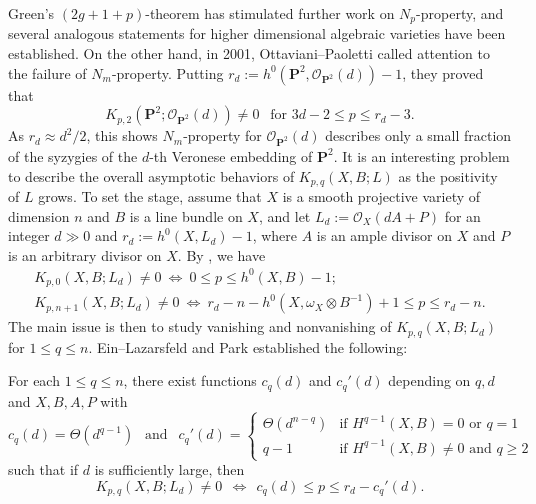 \documentclass[graybox]{svmult}
\newcommand{\kk}{\mathbf{k}}
\newcommand{\sO}{\mathscr{O}}
\def\nP{\mathbf{P}}
\begin{document}
Green's $(2g+1+p)$-theorem has stimulated further work on $N_p$-property, and several analogous statements for higher dimensional algebraic varieties have been established. On the other hand, in 2001, Ottaviani--Paoletti \cite{OP} called attention to the failure of $N_m$-property. Putting $r_d:=h^0(\nP^2, \sO_{\nP^2}(d))-1$, they proved that
$$
K_{p,2}(\nP^2; \sO_{\nP^2}(d)) \neq 0~~\text{ for $3d-2 \leq p \leq r_d-3$}.
$$
As $r_d \approx d^2/2$, this shows $N_m$-property for $\sO_{\nP^2}(d)$ describes only a small fraction of the syzygies of the $d$-th Veronese embedding of $\nP^2$. It is an interesting problem to describe the overall asymptotic behaviors of $K_{p,q}(X, B; L)$ as the positivity of $L$ grows. To set the stage, assume that $X$ is a smooth projective variety of dimension $n$ and $B$ is a line bundle on $X$, and let $L_d:=\sO_X(dA+P)$ for an integer $d \gg 0$ and $r_d:=h^0(X, L_d)-1$, where $A$ is an ample divisor on $X$ and $P$ is an arbitrary divisor on $X$. By \cite[Proposition 5.1 and Corollary 5.2]{EL2}, we have
\begin{equation}\label{eq:q=0,n+1}
\begin{array}{l}
K_{p,0}(X, B; L_d) \neq 0 ~\Longleftrightarrow~0 \leq p \leq h^0(X, B)-1;\\
K_{p, n+1}(X, B; L_d) \neq 0 ~\Longleftrightarrow~r_d-n-h^0(X, \omega_X \otimes B^{-1}) + 1 \leq p \leq r_d-n.
\end{array}
\end{equation}
The main issue is then to study vanishing and nonvanishing of $K_{p,q}(X, B; L_d)$ for $1 \leq q \leq n$. Ein--Lazarsfeld \cite{EL2} and Park \cite{Park1, Park3} established the following:

\begin{theorem}[{$\operatorname{char}(\kk)\geq 0$}]\label{thm:asysyz}
For each $1 \leq q \leq n$, there exist functions $c_q(d)$ and $c_q'(d)$ depending on $q, d$ and $X, B, A, P$ with
$$
c_q(d) = \Theta(d^{q-1})~~\text{ and }~~c_q'(d) = \begin{cases} \Theta(d^{n-q}) & \text{if $H^{q-1}(X, B) =0$ or $q=1$} \\  q-1 & \text{if $H^{q-1}(X, B) \neq 0$ and $q \geq 2$} \end{cases}
$$
such that if $d$ is sufficiently large, then
$$
K_{p,q}(X, B; L_d) \neq 0~~\Longleftrightarrow~~c_q(d) \leq p \leq r_d-c_q'(d).
$$
\end{theorem}
\end{document}
